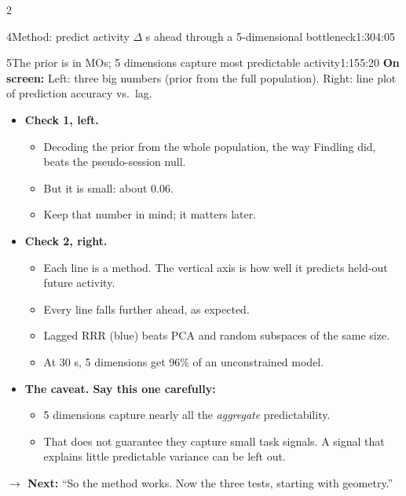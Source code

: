 \documentclass[10pt]{article}
\newcommand{\point}[1]{{\color{ink}\textbf{On screen:} #1}\par}
\newcommand{\bridge}[1]{\par{\color{accent}\textbf{$\rightarrow$ Next:} #1}\par}
\begin{document}
\begin{multicols}{2}
\begin{slidebox}{4}{Method: predict activity $\Delta$ s ahead through a 5-dimensional bottleneck}{1:30}{4:05}
\end{slidebox}
\begin{slidebox}{5}{The prior is in MOs; 5 dimensions capture most predictable activity}{1:15}{5:20}
\point{Left: three big numbers (prior from the full population). Right: line plot of prediction accuracy vs.\ lag.}
\begin{itemize}
\item \textbf{Check 1, left.}
  \begin{itemize}
  \item Decoding the prior from the whole population, the way Findling did, beats the pseudo-session null.
  \item But it is small: about 0.06.
  \item Keep that number in mind; it matters later.
  \end{itemize}
\item \textbf{Check 2, right.}
  \begin{itemize}
  \item Each line is a method. The vertical axis is how well it predicts held-out future activity.
  \item Every line falls further ahead, as expected.
  \item Lagged RRR (blue) beats PCA and random subspaces of the same size.
  \item At 30 s, 5 dimensions get 96\% of an unconstrained model.
  \end{itemize}
\item \textbf{The caveat. Say this one carefully:}
  \begin{itemize}
  \item 5 dimensions capture nearly all the \emph{aggregate} predictability.
  \item That does not guarantee they capture small task signals. A signal that explains little predictable variance
  can be left out.
  \end{itemize}
\end{itemize}
\bridge{``So the method works. Now the three tests, starting with geometry.''}


\end{slidebox}
\end{multicols}
\end{document}
